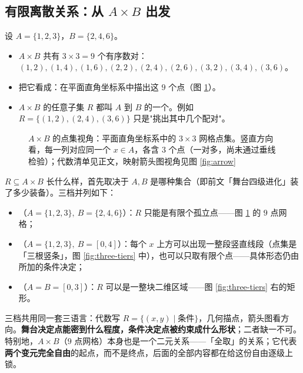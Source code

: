 \begin{explore}

\subsection{有限离散关系：从 $A\times B$ 出发}

设 $A=\{1,2,3\}$，$B=\{2,4,6\}$。
\begin{itemize}
  \item $A\times B$ 共有 $3\times3=9$ 个有序数对：
        $(1,2),(1,4),(1,6),(2,2),(2,4),(2,6),(3,2),(3,4),(3,6)$。
  \item 把它看成：在平面直角坐标系中描出这 $9$ 个点（图 \ref{fig:grid9}）。
  \item $A\times B$ 的任意子集 $R$ 都叫 $A$ 到 $B$ 的一个。例如 $R=\{(1,2),(2,4),(3,6)\}$ 只是"挑出其中几个配对"。
\end{itemize}

\begin{figure}[htbp]
  \centering
  \caption{$A\times B$ 的点集视角：平面直角坐标系中的 $3\times3$ 网格点集。竖直方向看，每一列对应同一个 $x\in A$，各含 $3$ 个点（一对多，尚未通过垂线检验）；代数清单见正文，映射箭头图视角见图 \ref{fig:arrow}}
  \label{fig:grid9}
\end{figure}

$R\subseteq A\times B$ 长什么样，首先取决于 $A,B$ 是哪种集合（即前文「舞台四级进化」装了多少装备）。三档并列如下：
\begin{itemize}
  \item {}（$A=\{1,2,3\},\ B=\{2,4,6\}$）：$R$ 只能是有限个孤立点——图 \ref{fig:grid9} 的 $9$ 点网格；
  \item {}（$A=\{1,2,3\},\ B=[0,4]$）：每个 $x$ 上方可以出现一整段竖直线段（点集是「三根竖条」，图 \ref{fig:three-tiers} 中），也可以只取有限个点——具体形态仍由所加的条件决定；
  \item {}（$A=B=[0,3]$）：$R$ 可以是一整块二维区域——图 \ref{fig:three-tiers} 右的矩形。
\end{itemize}
三档共用同一套三语言：代数写 $R=\{(x,y)\mid\text{条件}\}$，几何描点，箭头图看方向。\textbf{舞台决定点能密到什么程度，条件决定点被约束成什么形状}；二者缺一不可。特别地，$A\times B$（$9$ 点网格）本身也是一个二元关系——「全取」的关系；它代表\textbf{两个变元完全自由}的起点，而不是终点，后面的全部内容都在给这份自由逐级上锁。


\end{explore}
